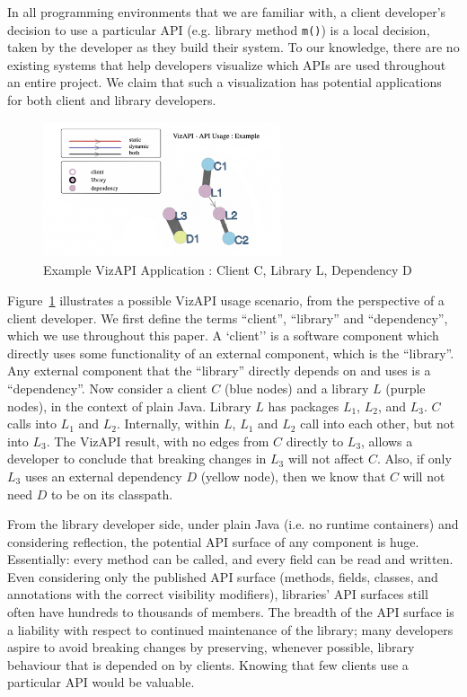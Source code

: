 In all programming environments that we are familiar with, a client developer's decision to use a particular API (e.g. library method {\tt m()}) is a local decision, taken by the developer as they build their system. To our knowledge, there are no existing systems that help developers visualize which APIs are used throughout an entire project. We claim that such a visualization has potential applications for both client and library developers.
\begin{figure}[h]
\begin{center}
\includegraphics[height=4cm,width=7cm]{images/intro-example.png}
\caption{Example VizAPI Application : Client C, Library L, Dependency D}
\label{fig:example}
\end{center}
\end{figure}


Figure~\ref{fig:example} illustrates a possible VizAPI usage scenario, from the perspective of a client developer. We first define the terms ``client'', ``library'' and ``dependency'', which we use throughout this paper. A `client'' is a software component which directly uses some functionality of an external component, which is the ``library''. Any external component that the ``library'' directly depends on and uses is a ``dependency''. Now consider a client $C$ (blue nodes) and a library $L$ (purple nodes), in the context of plain Java. Library $L$ has packages $L_1$, $L_2$, and $L_3$. $C$ calls into $L_1$ and $L_2$. Internally, within $L$, $L_1$ and $L_2$ call into each other, but not into $L_3$. The VizAPI result, with no edges from $C$ directly to $L_3$, allows a developer to conclude that breaking changes in $L_3$ will not affect $C$. Also, if only $L_3$ uses an external dependency $D$ (yellow node), then we know that $C$ will not need $D$ to be on its classpath.

From the library developer side, under plain Java (i.e. no runtime containers) and considering reflection, the potential API surface of any component is huge. Essentially: every method can be called, and every field can be read and written. Even considering only the published API surface (methods, fields, classes, and annotations with the correct visibility modifiers), libraries' API surfaces still often have hundreds to thousands of members. The breadth of the API surface is a liability with respect to continued maintenance of the library; many developers aspire to avoid breaking changes by preserving, whenever possible, library behaviour that is depended on by clients. Knowing that few clients use a particular API would be valuable.

